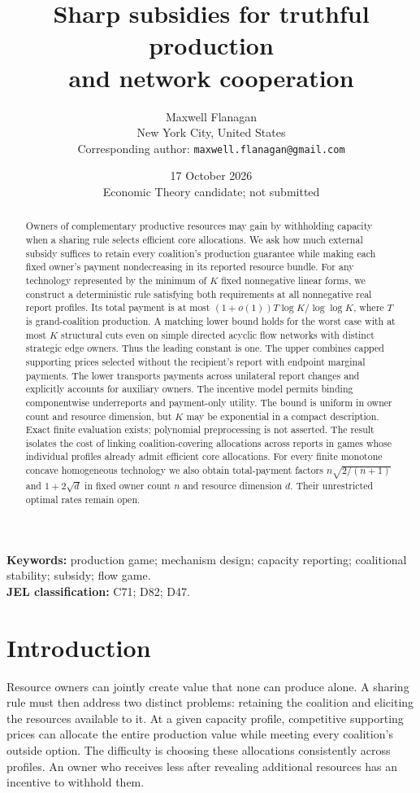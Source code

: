 \documentclass[11pt]{article}
\title{Sharp subsidies for truthful production\\and network cooperation}
\author{Maxwell Flanagan\\[2pt]\small New York City, United States\\[2pt]\small Corresponding author: \texttt{maxwell.flanagan@gmail.com}}
\date{17 October 2026\\[2pt]\small Economic Theory candidate; not submitted}
\theoremstyle{definition}\newtheorem{definition}[theorem]{Definition}
\theoremstyle{remark}\newtheorem{remark}[theorem]{Remark}
\begin{document}
\maketitle
\begin{abstract}
Owners of complementary productive resources may gain by withholding capacity
when a sharing rule selects efficient core allocations. We ask how much
external subsidy suffices to retain every coalition's production guarantee
while making each fixed owner's payment nondecreasing in its reported
resource bundle. For any technology represented by the minimum of $K$ fixed
nonnegative linear forms, we construct a deterministic rule satisfying both
requirements at all nonnegative real report profiles. Its total payment is
at most $(1+o(1))T\log K/\log\log K$, where $T$ is grand-coalition production.
A matching lower bound holds for the worst case with at most $K$ structural
cuts even on simple directed acyclic flow networks with distinct strategic
edge owners. Thus the leading constant is one. The upper combines capped
supporting prices selected without the recipient's report with endpoint
marginal payments. The lower transports payments across unilateral report
changes and explicitly accounts for auxiliary owners. The incentive model
permits binding componentwise underreports and payment-only utility.
The bound is uniform in owner count and resource dimension, but $K$ may be
exponential in a compact description. Exact finite evaluation exists;
polynomial preprocessing is not asserted. The result isolates the cost of
linking coalition-covering allocations across reports in games whose
individual profiles already admit efficient core allocations. For every finite
monotone concave homogeneous technology we also obtain total-payment factors
$n\sqrt{2/(n+1)}$ and $1+2\sqrt d$ in fixed owner count $n$ and resource
dimension $d$. Their unrestricted optimal rates remain open.
\end{abstract}
\noindent\textbf{Keywords:} production game; mechanism design; capacity reporting;
coalitional stability; subsidy; flow game.\\
\textbf{JEL classification:} C71; D82; D47.

\section{Introduction}
Resource owners can jointly create value that none can produce alone. A
sharing rule must then address two distinct problems: retaining the coalition
and eliciting the resources available to it. At a given capacity profile,
competitive supporting prices can allocate the entire production value while
meeting every coalition's outside option. The difficulty is choosing these
allocations consistently across profiles. An owner who receives less after
revealing additional resources has an incentive to withhold them.
\end{document}
